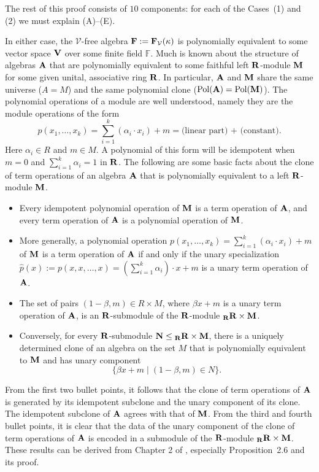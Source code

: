 \documentclass[12pt]{amsart}
\theoremstyle{definition}
\numberwithin{equation}{section}
\newcommand{\m}[1]{{\mathbf{\uppercase{#1}}}}
\begin{document}
The rest of this proof consists of $10$ components:
for each of the Cases~(1) and (2)  we must explain (A)--(E).

In either case, the $\mathcal{V}$-free algebra
$\m f := \m f_{\mathcal{V}}(\kappa)$ is polynomially equivalent to
some vector space $\m v$ over some finite field $\mathbb{F}$.
Much is known about the structure of
algebras $\m a$ that are polynomially
equivalent to some faithful
left $\m r$-module $\m m$ for some given
unital, associative ring $\m r$.
In particular, $\m a$ and $\m m$ share
the same universe ($A=M$) and the
same polynomial clone ($\textrm{Pol}(\m a)=\textrm{Pol}(\m m)$).
The polynomial operations of a module are well understood,
namely they are the module operations of the form
\[
p(x_1,\ldots,x_k) = \sum_{i=1}^k (\alpha_i\cdot x_i) + m =
\textrm{(linear part) + (constant).}
\]
Here $\alpha_i\in R$ and $m\in M$.
A polynomial of this form will be idempotent when
$m=0$ and $\sum_{i=1}^k \alpha_i = 1$ in $\m r$.
The following are some basic facts about the clone
of term operations of an algebra $\m a$
that is polynomially equivalent to a left $\m r$-module $\m m$.
\begin{itemize}
\item Every idempotent polynomial operation
of $\m m$ is a term operation
of $\m a$, and every term operation of $\m a$ is a polynomial
operation of $\m m$.
\item More generally, a polynomial operation
$p(x_1,\ldots,x_k)=\sum_{i=1}^k (\alpha_i\cdot x_i) + m$ of $\m m$
is a term operation of $\m a$ if and only if
the unary specialization
$\widehat{p}(x):=p(x,x,\ldots,x) = (\sum_{i=1}^k \alpha_i)\cdot x + m$
is a unary term operation of $\m a$.
\item  
The set of pairs $(1-\beta,m)\in R\times M$,
where $\beta x+m$ is a unary term operation of $\m a$,
is an $\m r$-submodule of the $\m r$-module
${}_{\m r}\m r\times \m m$.
\item  
Conversely, for every $\m r$-submodule
$\m n\leq {}_{\m r}\m r\times \m m$,
there is a uniquely determined clone of an algebra
on the set $M$ that is polynomially equivalent to $\m m$
and has unary component
\[
\{\beta x + m\;|\; (1-\beta,m)\in N\}.
\]
\end{itemize}
From the first two bullet points, it follows
that the clone of term operations of $\m a$
is generated by its idempotent subclone
and the unary component of its clone.
The idempotent subclone of $\m a$ agrees with that of $\m m$.
From the third
and fourth bullet points, it is clear that the data
of the unary component of the clone of term
operations of $\m a$ is encoded in a submodule
of the $\m r$-module
  ${}_{\m r}\m r\times \m m$.
These results can be derived from Chapter 2 of
\cite{clones}, especially Proposition~2.6
and its proof.
\end{document}
